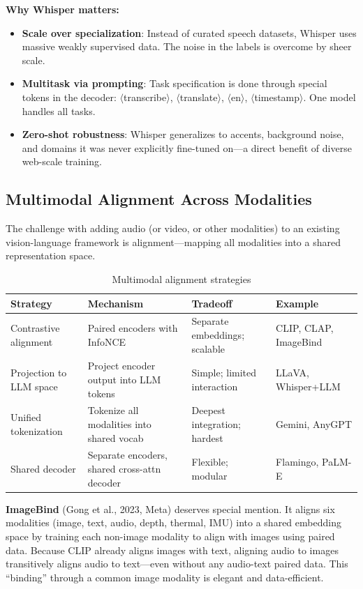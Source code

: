 \textbf{Why Whisper matters:}
\begin{itemize}
    \item \textbf{Scale over specialization}: Instead of curated speech datasets, Whisper uses massive weakly supervised data. The noise in the labels is overcome by sheer scale.
    \item \textbf{Multitask via prompting}: Task specification is done through special tokens in the decoder: $\langle$transcribe$\rangle$, $\langle$translate$\rangle$, $\langle$en$\rangle$, $\langle$timestamp$\rangle$. One model handles all tasks.
    \item \textbf{Zero-shot robustness}: Whisper generalizes to accents, background noise, and domains it was never explicitly fine-tuned on---a direct benefit of diverse web-scale training.
\end{itemize}

\subsection{Multimodal Alignment Across Modalities}

The challenge with adding audio (or video, or other modalities) to an existing vision-language framework is alignment---mapping all modalities into a shared representation space.

\begin{table}[H]
\centering
\caption{Multimodal alignment strategies}
\begin{tabularx}{\textwidth}{lXXl}
\toprule
\textbf{Strategy} & \textbf{Mechanism} & \textbf{Tradeoff} & \textbf{Example} \\
\midrule
Contrastive alignment & Paired encoders with InfoNCE & Separate embeddings; scalable & CLIP, CLAP, ImageBind \\
Projection to LLM space & Project encoder output into LLM tokens & Simple; limited interaction & LLaVA, Whisper+LLM \\
Unified tokenization & Tokenize all modalities into shared vocab & Deepest integration; hardest & Gemini, AnyGPT \\
Shared decoder & Separate encoders, shared cross-attn decoder & Flexible; modular & Flamingo, PaLM-E \\
\bottomrule
\end{tabularx}
\end{table}

\textbf{ImageBind} (Gong et al., 2023, Meta) deserves special mention. It aligns six modalities (image, text, audio, depth, thermal, IMU) into a shared embedding space by training each non-image modality to align with images using paired data. Because CLIP already aligns images with text, aligning audio to images transitively aligns audio to text---even without any audio-text paired data. This ``binding'' through a common image modality is elegant and data-efficient.

